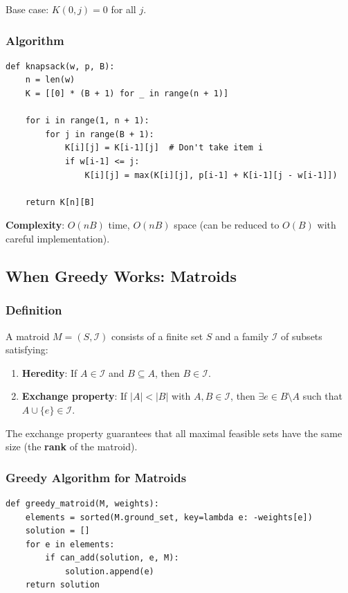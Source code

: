 \documentclass[11pt]{article}
\begin{document}
{{{Base case: $K(0, j) = 0$ for all $j$.

\subsubsection*{Algorithm}
\begin{lstlisting}
def knapsack(w, p, B):
    n = len(w)
    K = [[0] * (B + 1) for _ in range(n + 1)]
    
    for i in range(1, n + 1):
        for j in range(B + 1):
            K[i][j] = K[i-1][j]  # Don't take item i
            if w[i-1] <= j:
                K[i][j] = max(K[i][j], p[i-1] + K[i-1][j - w[i-1]])
    
    return K[n][B]
\end{lstlisting}

\textbf{Complexity}: $O(nB)$ time, $O(nB)$ space (can be reduced to $O(B)$ with careful implementation).

\subsection*{When Greedy Works: Matroids}

\subsubsection*{Definition}
A matroid $M = (S, \mathcal{I})$ consists of a finite set $S$ and a family $\mathcal{I}$ of subsets satisfying:

\begin{enumerate}
\item \textbf{Heredity}: If $A \in \mathcal{I}$ and $B \subseteq A$, then $B \in \mathcal{I}$.
\item \textbf{Exchange property}: If $|A| < |B|$ with $A, B \in \mathcal{I}$, then $\exists e \in B \setminus A$ such that $A \cup \{e\} \in \mathcal{I}$.
\end{enumerate}

The exchange property guarantees that all maximal feasible sets have the same size (the \textbf{rank} of the matroid).

\subsubsection*{Greedy Algorithm for Matroids}

\begin{lstlisting}
def greedy_matroid(M, weights):
    elements = sorted(M.ground_set, key=lambda e: -weights[e])
    solution = []
    for e in elements:
        if can_add(solution, e, M):
            solution.append(e)
    return solution
\end{lstlisting}

}}}
\end{document}

